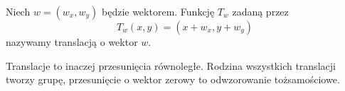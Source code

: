 
\begin{definition}[translacje]
    Niech $w = (w_x, w_y)$ będzie wektorem.
    Funkcję $T_w$ zadaną przez
    \begin{equation}
        T_w(x, y) = (x + w_x, y + w_y)
    \end{equation}
    nazywamy translacją o wektor $w$.
\end{definition}

Translacje to inaczej przesunięcia równoległe.
Rodzina wszystkich translacji tworzy grupę, przesunięcie o wektor zerowy to odwzorowanie tożsamościowe.
